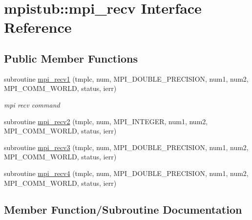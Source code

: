 \hypertarget{interfacempistub_1_1mpi__recv}{}\section{mpistub\+::mpi\+\_\+recv Interface Reference}
\label{interfacempistub_1_1mpi__recv}
\subsection*{Public Member Functions}
\begin{DoxyCompactItemize}
\item 
subroutine \mbox{\hyperlink{interfacempistub_1_1mpi__recv_acbe76dff6c40bea245b41ac988a9d344}{mpi\+\_\+recv1}} (tmplc, num, M\+P\+I\+\_\+\+D\+O\+U\+B\+L\+E\+\_\+\+P\+R\+E\+C\+I\+S\+I\+ON, num1, num2, M\+P\+I\+\_\+\+C\+O\+M\+M\+\_\+\+W\+O\+R\+LD, status, ierr)
\begin{DoxyCompactList}\small\item\em mpi recv command \end{DoxyCompactList}\item 
subroutine \mbox{\hyperlink{interfacempistub_1_1mpi__recv_a58c9fdc428722f7a4acb870279785253}{mpi\+\_\+recv2}} (tmplc, num, M\+P\+I\+\_\+\+I\+N\+T\+E\+G\+ER, num1, num2, M\+P\+I\+\_\+\+C\+O\+M\+M\+\_\+\+W\+O\+R\+LD, status, ierr)
\item 
subroutine \mbox{\hyperlink{interfacempistub_1_1mpi__recv_afde125ef751e35a1e41b3014e63dd2e6}{mpi\+\_\+recv3}} (tmplc, num, M\+P\+I\+\_\+\+D\+O\+U\+B\+L\+E\+\_\+\+P\+R\+E\+C\+I\+S\+I\+ON, num1, num2, M\+P\+I\+\_\+\+C\+O\+M\+M\+\_\+\+W\+O\+R\+LD, status, ierr)
\item 
subroutine \mbox{\hyperlink{interfacempistub_1_1mpi__recv_afcc33e8f27f82840249749be728fe594}{mpi\+\_\+recv4}} (tmplc, num, M\+P\+I\+\_\+\+D\+O\+U\+B\+L\+E\+\_\+\+P\+R\+E\+C\+I\+S\+I\+ON, num1, num2, M\+P\+I\+\_\+\+C\+O\+M\+M\+\_\+\+W\+O\+R\+LD, status, ierr)
\end{DoxyCompactItemize}


\subsection{Member Function/\+Subroutine Documentation}
\mbox{\label{interfacempistub_1_1mpi__recv_acbe76dff6c40bea245b41ac988a9d344}} 
